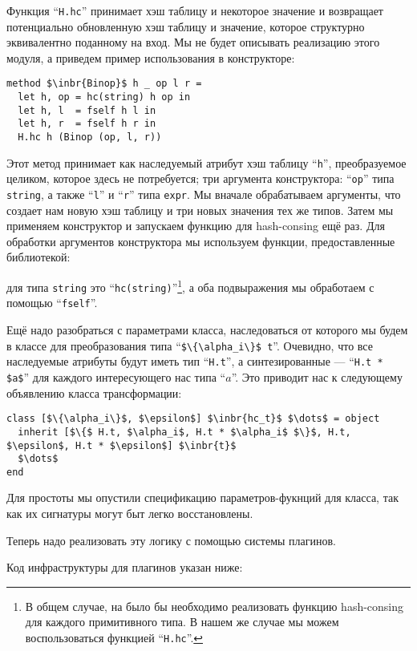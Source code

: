 Функция  ``\lstinline{H.hc}'' принимает хэш таблицу и некоторое значение и возвращает потенциально обновленную хэш таблицу и значение, которое структурно эквивалентно поданному на вход. Мы не будет описывать реализацию этого модуля, а приведем пример использования в конструкторе:

\begin{lstlisting}
method $\inbr{Binop}$ h _ op l r =
  let h, op = hc(string) h op in
  let h, l  = fself h l in
  let h, r  = fself h r in
  H.hc h (Binop (op, l, r))
\end{lstlisting}

Этот метод принимает как наследуемый атрибут хэш таблицу ``\lstinline{h}'', преобразуемое целиком, которое здесь не потребуется; три аргумента конструктора: ``\lstinline{op}'' типа \lstinline{string}, а также ``\lstinline{l}'' и ``\lstinline{r}'' типа \lstinline{expr}. 
Мы вначале обрабатываем аргументы, что создает нам новую хэш таблицу и три новых значения тех же типов. Затем мы применяем конструктор и запускаем функцию для hash-consing ещё раз.  Для обработки аргументов конструктора мы используем функции, предоставленные библиотекой:

для типа \lstinline{string} это ``\lstinline{hc(string)}''\footnote{В общем случае, на было бы необходимо реализовать функцию hash-consing для каждого примитивного типа. В нашем же случае мы можем воспользоваться функцией ``\lstinline{H.hc}''.}, а оба подвыражения мы обработаем с помощью ``\lstinline{fself}''.

Ещё надо разобраться с параметрами класса, наследоваться от которого мы будем в классе для преобразования типа ``\lstinline|$\{\alpha_i\}$ t|''. 
Очевидно, что все наследуемые атрибуты будут иметь тип  ``\lstinline{H.t}'', а синтезированные --- ``\lstinline{H.t * $a$}'' для каждого интересующего нас типа ``$a$''.
Это приводит нас к следующему объявлению класса трансформации:

\begin{lstlisting}
class [$\{\alpha_i\}$, $\epsilon$] $\inbr{hc_t}$ $\dots$ = object
  inherit [$\{$ H.t, $\alpha_i$, H.t * $\alpha_i$ $\}$, H.t, $\epsilon$, H.t * $\epsilon$] $\inbr{t}$
  $\dots$
end
\end{lstlisting}

Для простоты мы опустили спецификацию параметров-фукнций для класса, так как их сигнатуры могут быт легко восстановлены.

Теперь надо реализовать эту логику с помощью системы плагинов.

Код инфраструктуры для плагинов указан ниже:

